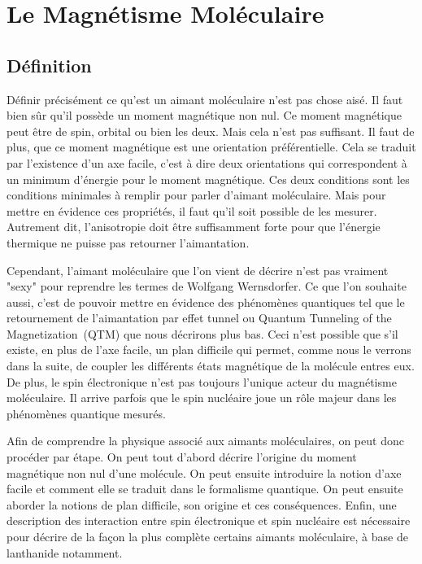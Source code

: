 \chapter{Le Magnétisme Moléculaire}

\section{Définition}
Définir précisément ce qu'est un aimant moléculaire n'est pas chose aisé. Il faut bien s\^ur qu'il possède un moment magnétique non nul. Ce moment magnétique peut \^etre de spin, orbital ou bien les deux. Mais cela n'est pas suffisant. Il faut de plus, que ce moment magnétique est une orientation préférentielle. Cela se traduit par l'existence d'un axe facile, c'est à dire deux orientations qui correspondent à un minimum d'énergie pour le moment magnétique. Ces deux conditions sont les conditions minimales à remplir pour parler d'aimant moléculaire. Mais pour mettre en évidence ces propriétés, il faut qu'il soit possible de les mesurer. Autrement dit, l'anisotropie doit \^etre suffisamment forte pour que l'énergie thermique ne puisse pas retourner l'aimantation.

Cependant, l'aimant moléculaire que l'on vient de décrire n'est pas vraiment "sexy" pour reprendre les termes de Wolfgang Wernsdorfer. Ce que l'on souhaite aussi, c'est de pouvoir mettre en évidence des phénomènes quantiques tel que le retournement de l'aimantation par effet tunnel ou Quantum Tunneling of the Magnetization~(QTM) que nous décrirons plus bas. Ceci n'est possible que s'il existe, en plus de l'axe facile, un plan difficile qui permet, comme nous le verrons dans la suite, de coupler les différents états magnétique de la molécule entres eux. De plus, le spin électronique n'est pas toujours l'unique acteur du magnétisme moléculaire. Il arrive parfois que le spin nucléaire joue un r\^ole majeur dans les phénomènes quantique mesurés.

Afin de comprendre la physique associé aux aimants moléculaires, on peut donc procéder par étape. On peut tout d'abord décrire l'origine du moment magnétique non nul d'une molécule. On peut ensuite introduire la notion d'axe facile et comment elle se traduit dans le formalisme quantique. On peut ensuite aborder la notions de plan difficile, son origine et ces conséquences. Enfin, une description des interaction entre spin électronique et spin nucléaire est nécessaire pour décrire de la façon la plus complète certains aimants moléculaire, à base de lanthanide notamment.

